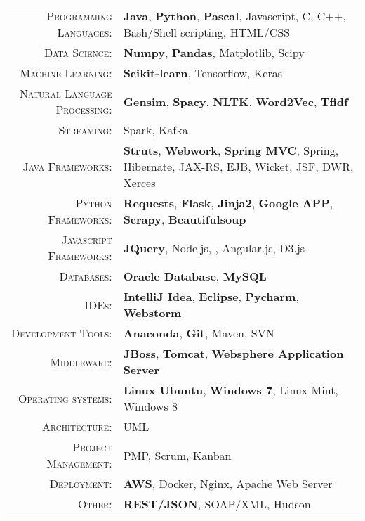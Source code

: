 %
%
%

\renewcommand{\arraystretch}{1.1}

	\begin{tabular}{>{}r>{}p{13cm}} 
		\textsc{Programming Languages:}  		&   \textbf{Java}, \textbf{Python}, \textbf{Pascal},  Javascript, C, C++, Bash/Shell scripting, HTML/CSS\\ 
		\textsc{Data Science:}                  &   \textbf{Numpy}, \textbf{Pandas}, Matplotlib, Scipy\\
		\textsc{Machine Learning:}				 &  \textbf{Scikit-learn}, Tensorflow, Keras\\
		\textsc{Natural Language Processing:} 	 & \textbf{Gensim}, \textbf{Spacy}, \textbf{NLTK}, \textbf{Word2Vec}, \textbf{Tfidf}\\
		\textsc{Streaming:}                  	&   Spark, Kafka\\
		\textsc{Java Frameworks:} 				& \textbf{Struts}, \textbf{Webwork}, \textbf{Spring MVC}, Spring, Hibernate, JAX-RS, EJB, Wicket, JSF, DWR, Xerces\\
		\textsc{Python Frameworks:} 				& \textbf{Requests}, \textbf{Flask}, \textbf{Jinja2}, \textbf{Google APP},  \textbf{Scrapy}, \textbf{Beautifulsoup}\\ 
		\textsc{Javascript Frameworks:} 				& \textbf{JQuery}, Node.js, , Angular.js, D3.js \\
		\textsc{Databases:}                  &   \textbf{Oracle Database}, \textbf{MySQL} \\ 
		\textsc{IDEs:}	  		&   \textbf{IntelliJ Idea}, \textbf{Eclipse}, \textbf{Pycharm}, \textbf{Webstorm}  \\ 
		\textsc{Development Tools:} & 	  		\textbf{Anaconda}, \textbf{Git}, Maven, SVN \\
		\textsc{Middleware:}				        &   \textbf{JBoss}, \textbf{Tomcat}, \textbf{Websphere Application Server} \\ 
		\textsc{Operating systems:}	        &   \textbf{Linux Ubuntu}, \textbf{Windows 7}, Linux Mint, Windows 8\\ 
		\textsc{Architecture:}				        &   UML \\
		\textsc{Project Management:}				        &   PMP, Scrum, Kanban \\
		\textsc{Deployment:}				        &   \textbf{AWS}, Docker, Nginx, Apache Web Server\\
		\textsc{Other:}					        &   \textbf{REST/JSON}, SOAP/XML, Hudson \\
	\end{tabular}